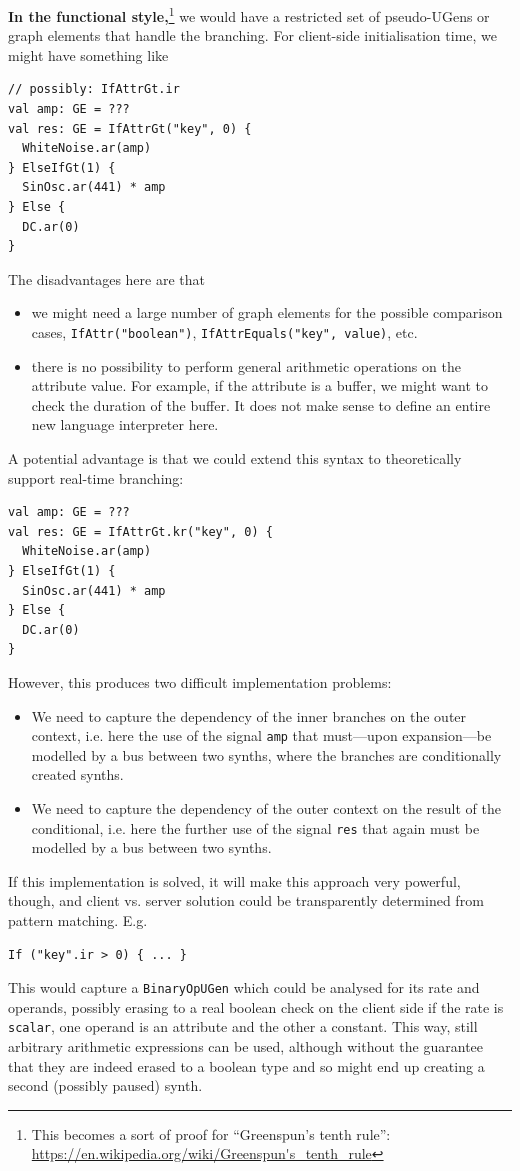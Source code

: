 \documentclass[11pt,a4paper]{article}
\begin{document}
\textbf{In the functional style,}\footnote{This becomes a sort of proof for ``Greenspun's tenth rule'': \url{https://en.wikipedia.org/wiki/Greenspun's_tenth_rule}} we would have a restricted set of pseudo-UGens or graph elements that handle the branching. For client-side initialisation time, we might have something like
%
\begin{verbatim}
// possibly: IfAttrGt.ir
val amp: GE = ???
val res: GE = IfAttrGt("key", 0) {
  WhiteNoise.ar(amp)
} ElseIfGt(1) {
  SinOsc.ar(441) * amp
} Else {
  DC.ar(0)
}
\end{verbatim}
%
The disadvantages here are that
\begin{itemize}
\item we might need a large number of graph elements for the possible comparison cases, \verb!IfAttr("boolean")!, \verb!IfAttrEquals("key", value)!, etc.
\item there is no possibility to perform general arithmetic operations on the attribute value. For example, if the attribute is a buffer, we might want to check the duration of the buffer. It does not make sense to define an entire new language interpreter here.
\end{itemize}
%
A potential advantage is that we could extend this syntax to theoretically support real-time branching:
%
\begin{verbatim}
val amp: GE = ???
val res: GE = IfAttrGt.kr("key", 0) {
  WhiteNoise.ar(amp)
} ElseIfGt(1) {
  SinOsc.ar(441) * amp
} Else {
  DC.ar(0)
}
\end{verbatim}
%
However, this produces two difficult implementation problems:
%
\begin{itemize}
\item We need to capture the dependency of the inner branches on the outer context, i.e. here the use of the signal \verb!amp! that must---upon expansion---be modelled by a bus between two synths, where the branches are conditionally created synths.
\item We need to capture the dependency of the outer context on the result of the conditional, i.e. here the further use of the signal \verb!res! that again must be modelled by a bus between two synths.
\end{itemize}
%
If this implementation is solved, it will make this approach very powerful, though, and client vs. server solution could be transparently determined from pattern matching. E.g.
%
\begin{verbatim}
If ("key".ir > 0) { ... }
\end{verbatim}
%
This would capture a \verb!BinaryOpUGen! which could be analysed for its rate and operands, possibly erasing to a real boolean check on the client side if the rate is \verb!scalar!, one operand is an attribute and the other a constant. This way, still arbitrary arithmetic expressions can be used, although without the guarantee that they are indeed erased to a boolean type and so might end up creating a second (possibly paused) synth.
\end{document}
